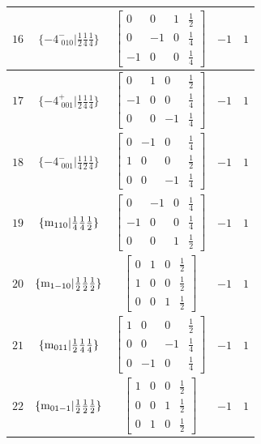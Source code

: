 \documentclass[fleqn,8pt]{jsarticle}
\begin{document}
\begin{longtable}{ccccc}
$ 16 $ & $ \{-4^{-}_{\,\,010}|\frac{1}{2} \frac{1}{4} \frac{1}{4}\} $ & $ \begin{bmatrix} 0 & 0 & 1 & \frac{1}{2} \\ 0 & -1 & 0 & \frac{1}{4} \\ -1 & 0 & 0 & \frac{1}{4} \end{bmatrix} $ & $ -1 $ & $ 1 $ \\ \hline
$ 17 $ & $ \{-4^{+}_{\,\,001}|\frac{1}{2} \frac{1}{4} \frac{1}{4}\} $ & $ \begin{bmatrix} 0 & 1 & 0 & \frac{1}{2} \\ -1 & 0 & 0 & \frac{1}{4} \\ 0 & 0 & -1 & \frac{1}{4} \end{bmatrix} $ & $ -1 $ & $ 1 $ \\ \hline
$ 18 $ & $ \{-4^{-}_{\,\,001}|\frac{1}{4} \frac{1}{2} \frac{1}{4}\} $ & $ \begin{bmatrix} 0 & -1 & 0 & \frac{1}{4} \\ 1 & 0 & 0 & \frac{1}{2} \\ 0 & 0 & -1 & \frac{1}{4} \end{bmatrix} $ & $ -1 $ & $ 1 $ \\ \hline
$ 19 $ & $ \{{\rm m}_{110}|\frac{1}{4} \frac{1}{4} \frac{1}{2}\} $ & $ \begin{bmatrix} 0 & -1 & 0 & \frac{1}{4} \\ -1 & 0 & 0 & \frac{1}{4} \\ 0 & 0 & 1 & \frac{1}{2} \end{bmatrix} $ & $ -1 $ & $ 1 $ \\ \hline
$ 20 $ & $ \{{\rm m}_{1-10}|\frac{1}{2} \frac{1}{2} \frac{1}{2}\} $ & $ \begin{bmatrix} 0 & 1 & 0 & \frac{1}{2} \\ 1 & 0 & 0 & \frac{1}{2} \\ 0 & 0 & 1 & \frac{1}{2} \end{bmatrix} $ & $ -1 $ & $ 1 $ \\ \hline
$ 21 $ & $ \{{\rm m}_{011}|\frac{1}{2} \frac{1}{4} \frac{1}{4}\} $ & $ \begin{bmatrix} 1 & 0 & 0 & \frac{1}{2} \\ 0 & 0 & -1 & \frac{1}{4} \\ 0 & -1 & 0 & \frac{1}{4} \end{bmatrix} $ & $ -1 $ & $ 1 $ \\ \hline
$ 22 $ & $ \{{\rm m}_{01-1}|\frac{1}{2} \frac{1}{2} \frac{1}{2}\} $ & $ \begin{bmatrix} 1 & 0 & 0 & \frac{1}{2} \\ 0 & 0 & 1 & \frac{1}{2} \\ 0 & 1 & 0 & \frac{1}{2} \end{bmatrix} $ & $ -1 $ & $ 1 $ \\ \hline

\end{longtable}
\end{document}

